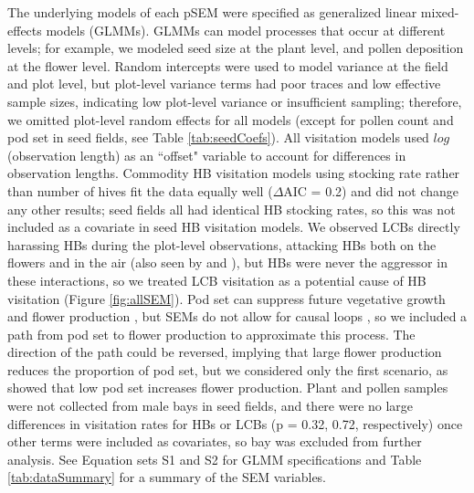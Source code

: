 \documentclass[12pt]{article} %
\begin{document}
The underlying models of each pSEM were specified as generalized linear mixed-effects models (GLMMs).
GLMMs can model processes that occur at different levels; for example, we modeled seed size at the plant level, and pollen deposition at the flower level.
Random intercepts were used to model variance at the field and plot level, but plot-level variance terms had poor traces and low effective sample sizes, indicating low plot-level variance or insufficient sampling; therefore, we omitted plot-level random effects for all models (except for pollen count and pod set in seed fields, see Table \ref{tab:seedCoefs}).
All visitation models used $log$(observation length) as an ``offset" variable to account for differences in observation lengths.
Commodity HB visitation models using stocking rate rather than number of hives fit the data equally well ($\Delta$AIC = 0.2) and did not change any other results; seed fields all had identical HB stocking rates, so this was not included as a covariate in seed HB visitation models.
We observed LCBs directly harassing HBs during the plot-level observations, attacking HBs both on the flowers and in the air (also seen by \citealp{batra1978} and \citealp{waytes2022}), but HBs were never the aggressor in these interactions, so we treated LCB visitation as a potential cause of HB visitation (Figure \ref{fig:allSEM}).
Pod set can suppress future vegetative growth and flower production \citep{stephenson1981}, but SEMs do not allow for causal loops \citep{grace2012}, so we included a path from pod set to flower production to approximate this process.
The direction of the path could be reversed, implying that large flower production reduces the proportion of pod set, but we considered only the first scenario, as \citet{sabbahi2006} showed that low pod set increases flower production.
Plant and pollen samples were not collected from male bays in seed fields, and there were no large differences in visitation rates for HBs or LCBs (p = 0.32, 0.72, respectively) once other terms were included as covariates, so bay was excluded from further analysis.
See Equation sets S1 and S2 for GLMM specifications and Table \ref{tab:dataSummary} for a summary of the SEM variables.
\end{document}
